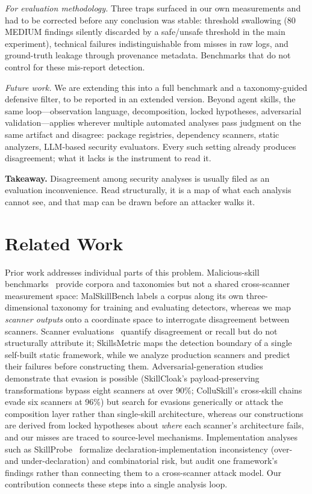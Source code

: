 \documentclass[sigconf,nonacm]{acmart}
\begin{document}
\emph{For evaluation methodology.} Three traps surfaced in our own measurements and had to be corrected before any conclusion was stable: threshold swallowing (80 MEDIUM findings silently discarded by a safe/unsafe threshold in the main experiment), technical failures indistinguishable from misses in raw logs, and ground-truth leakage through provenance metadata. Benchmarks that do not control for these mis-report detection.

\emph{Future work.} We are extending this into a full benchmark and a taxonomy-guided defensive filter, to be reported in an extended version. Beyond agent skills, the same loop---observation language, decomposition, locked hypotheses, adversarial validation---applies wherever multiple automated analyses pass judgment on the same artifact and disagree: package registries, dependency scanners, static analyzers, LLM-based security evaluators. Every such setting already produces disagreement; what it lacks is the instrument to read it.

\medskip
\noindent\textbf{Takeaway.} Disagreement among security analyses is usually filed as an evaluation inconvenience. Read structurally, it is a map of what each analysis cannot see, and that map can be drawn before an attacker walks it.

\section{Related Work}
\label{sec:related}

Prior work addresses individual parts of this problem. Malicious-skill benchmarks~\cite{malskillbench2026,skilltrustbench2026} provide corpora and taxonomies but not a shared cross-scanner measurement space: MalSkillBench labels a corpus along its own three-dimensional taxonomy for training and evaluating detectors, whereas we map \emph{scanner outputs} onto a coordinate space to interrogate disagreement between scanners. Scanner evaluations~\cite{clawhub2026,locatejudge2026,skillscan2026,skillsmetric2026} quantify disagreement or recall but do not structurally attribute it; SkillsMetric maps the detection boundary of a single self-built static framework, while we analyze production scanners and predict their failures before constructing them. Adversarial-generation studies~\cite{cloakdetonate2026,colluskill2026} demonstrate that evasion is possible (SkillCloak's payload-preserving transformations bypass eight scanners at over 90\%; ColluSkill's cross-skill chains evade six scanners at 96\%) but search for evasions generically or attack the composition layer rather than single-skill architecture, whereas our constructions are derived from locked hypotheses about \emph{where} each scanner's architecture fails, and our misses are traced to source-level mechanisms. Implementation analyses such as SkillProbe~\cite{skillprobe2026} formalize declaration-implementation inconsistency (over- and under-declaration) and combinatorial risk, but audit one framework's findings rather than connecting them to a cross-scanner attack model. Our contribution connects these steps into a single analysis loop.



\end{document}
